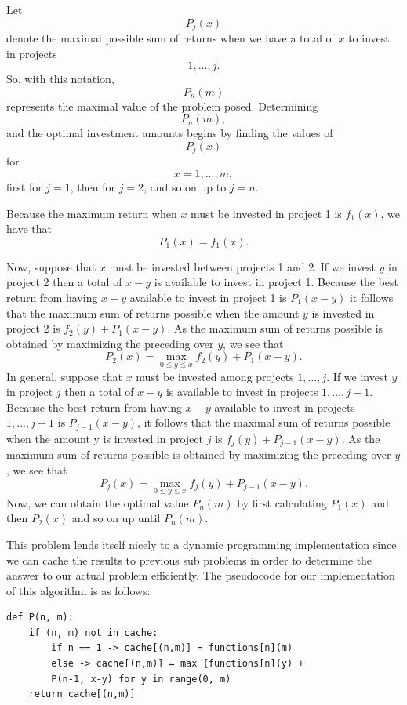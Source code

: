 \documentclass{article}
\begin{document}
Let $$P_{j}(x)$$ denote the maximal possible sum of returns when we have a total of $x$ to invest in projects $$1, ..., j.$$ So, with this notation, $$P_{n}(m)$$ represents the maximal value of the problem posed. Determining $$P_{n}(m),$$ and the optimal investment amounts begins by finding the values of $$P_{j}(x)$$ for $$x = 1, ..., m,$$ first for $j = 1$, then for $j=2$, and so on up to $j=n$.
\par
Because the maximum return when $x$ must be invested in project 1 is $f_{1}(x)$, we have that 
\newline
$$P_{1}(x) = f_{1}(x).$$
\newline
\par
Now, suppose that $x$ must be invested between projects 1 and 2. If we invest $y$ in project 2 then a total of $x-y$ is available to invest in project 1. Because the best return from having $x-y$ available to invest in project 1 is $P_{1}(x-y)$ it follows that the maximum sum of returns possible when the amount $y$ is invested in project 2 is $f_{2}(y) + P_{1}(x-y).$ As the maximum sum of returns possible is obtained by maximizing the preceding over $y$, we see that $$P_{2}(x) = \max_{0\leq y\leq x} f_{2}(y) + P_{1}(x-y).$$
In general, suppose that $x$ must be invested among projects $1, ..., j$. If we invest $y$ in project $j$ then a total of $x-y$ is available to invest in projects $1, ..., j-1$. Because the best return from having $x-y$ available to invest in projects $1, ..., j-1$ is $P_{j-1}(x-y)$, it follows that the maximal sum of returns possible when the amount y is invested in project $j$ is $f_{j}(y) + P_{j-1}(x-y).$ As the maximum sum of returns possible is obtained by maximizing the preceding over $y$, we see that 
\newline
$$P_{j}(x) = \max_{0\leq y\leq x} f_{j}(y) + P_{j-1}(x-y).$$
\newline
Now, we can obtain the optimal value $P_{n}(m)$ by first calculating $P_{1}(x)$ and then $P_{2}(x)$ and so on up until $P_{n}(m).$ 
\newline
\par
This problem lends itself nicely to a dynamic programming implementation since we can cache the results to previous sub problems in order to determine the answer to our actual problem efficiently.  The pseudocode for our implementation of this algorithm is as follows:
\newline
\begin{lstlisting}
def P(n, m):
    if (n, m) not in cache:
        if n == 1 -> cache[(n,m)] = functions[n](m)
        else -> cache[(n,m)] = max {functions[n](y) + 
        P(n-1, x-y) for y in range(0, m)
    return cache[(n,m)]

\end{lstlisting}
\newline
\par
\end{document}
